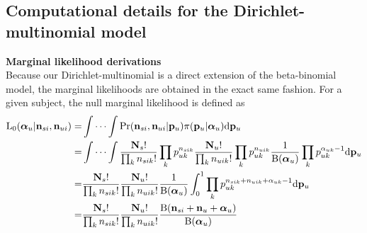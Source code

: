 \documentclass{article}
\begin{document}
\subsection{Computational details for the Dirichlet-multinomial model}
\noindent\textbf{Marginal likelihood derivations}\\
Because our Dirichlet-multinomial is a direct extension of the beta-binomial model, the marginal likelihoods are obtained in the exact same fashion.
For a given subject, the null marginal likelihood is defined as
\[
\begin{split}
\mathrm{L_0}(\boldsymbol{\alpha}_u|\mathbf{n}_{si},\mathbf{n}_{ui})=&\idotsint\mathrm{Pr}(\mathbf{n}_{si},\mathbf{n}_{ui}|\mathbf{p}_u)\pi(\mathbf{p}_u|\boldsymbol{\alpha}_u)\mathrm{d}\mathbf{p}_u\\
=&\idotsint \frac{\mathbf{N}_s!}{\prod_k {n}_{sik}!}\prod_k p^{n_{sik}}_{uk} \frac{\mathbf{N}_u!}{\prod_k {n}_{uik}!}\prod_k p^{n_{uik}}_{uk}\frac{1}{\mathrm{B}(\boldsymbol{\alpha}_u)}\prod_k p_{uk}^{\alpha_{uk}-1}\mathrm{d}\mathbf{p}_u\\
=&\frac{\mathbf{N}_s!}{\prod_k {n}_{sik}!}\frac{\mathbf{N}_u!}{\prod_k {n}_{uik}!}\frac{1}{\mathrm{B}(\boldsymbol{\alpha}_u)}\int_0^1 \prod_k p^{n_{sik}+n_{uik}+\alpha_{uk}-1}_{uk}\mathrm{d}\mathbf{p}_u\\
=&\frac{\mathbf{N}_s!}{\prod_k {n}_{sik}!}\frac{\mathbf{N}_u!}{\prod_k {n}_{uik}!}\frac{\mathrm{B}(\mathbf{n}_{si}+\mathbf{n}_u+\boldsymbol{\alpha}_u)}{\mathrm{B}(\boldsymbol{\alpha}_u)}
\end{split}
\]
\end{document}
